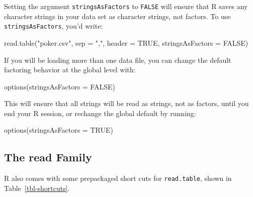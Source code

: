 \documentclass[
  letterpaper,
  DIV=11,
  numbers=noendperiod]{scrbook}
\newenvironment{Shaded}{\begin{snugshade}}{\end{snugshade}}
\newcommand{\AttributeTok}[1]{\textcolor[rgb]{0.40,0.45,0.13}{#1}}
\newcommand{\ConstantTok}[1]{\textcolor[rgb]{0.56,0.35,0.01}{#1}}
\newcommand{\FunctionTok}[1]{\textcolor[rgb]{0.28,0.35,0.67}{#1}}
\newcommand{\NormalTok}[1]{\textcolor[rgb]{0.00,0.23,0.31}{#1}}
\newcommand{\StringTok}[1]{\textcolor[rgb]{0.13,0.47,0.30}{#1}}
\begin{document}
Setting the argument \texttt{stringsAsFactors} to \texttt{FALSE} will
ensure that R saves any character strings in your data set as character
strings, not factors. To use \texttt{stringsAsFactors}, you'd write:

\begin{Shaded}
\begin{Highlighting}[]
\FunctionTok{read.table}\NormalTok{(}\StringTok{"poker.csv"}\NormalTok{, }\AttributeTok{sep =} \StringTok{","}\NormalTok{, }\AttributeTok{header =} \ConstantTok{TRUE}\NormalTok{, }\AttributeTok{stringsAsFactors =} \ConstantTok{FALSE}\NormalTok{)}
\end{Highlighting}
\end{Shaded}

If you will be loading more than one data file, you can change the
default factoring behavior at the global level with:

\begin{Shaded}
\begin{Highlighting}[]
\FunctionTok{options}\NormalTok{(}\AttributeTok{stringsAsFactors =} \ConstantTok{FALSE}\NormalTok{)}
\end{Highlighting}
\end{Shaded}

This will ensure that all strings will be read as strings, not as
factors, until you end your R session, or rechange the global default by
running:

\begin{Shaded}
\begin{Highlighting}[]
\FunctionTok{options}\NormalTok{(}\AttributeTok{stringsAsFactors =} \ConstantTok{TRUE}\NormalTok{)}
\end{Highlighting}
\end{Shaded}

\subsection{The read Family}\label{the-read-family}

R also comes with some prepackaged short cuts for \texttt{read.table},
shown in Table~\ref{tbl-shortcuts}.
\end{document}
